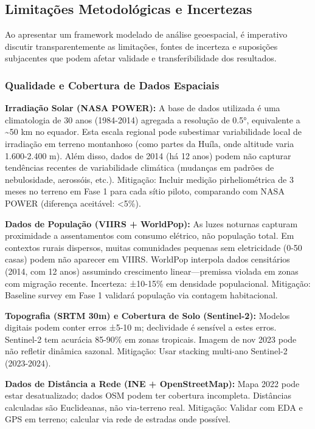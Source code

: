 \documentclass[12pt, a4paper]{article}
\begin{document}
\subsection{Limitações Metodológicas e Incertezas}

Ao apresentar um framework modelado de análise geoespacial, é imperativo discutir transparentemente as limitações, fontes de incerteza e suposições subjacentes que podem afetar validade e transferibilidade dos resultados.

\subsubsection{Qualidade e Cobertura de Dados Espaciais}

\textbf{Irradiação Solar (NASA POWER):} A base de dados utilizada é uma climatologia de 30 anos (1984-2014) agregada a resolução de 0.5°, equivalente a \textasciitilde{}50 km no equador. Esta escala regional pode subestimar variabilidade local de irradiação em terreno montanhoso (como partes da Huíla, onde altitude varia 1.600-2.400 m). Além disso, dados de 2014 (há 12 anos) podem não capturar tendências recentes de variabilidade climática (mudanças em padrões de nebulosidade, aerossóis, etc.). Mitigação: Incluir medição pirheliométrica de 3 meses no terreno em Fase 1 para cada sítio piloto, comparando com NASA POWER (diferença aceitável: <5\%).

\textbf{Dados de População (VIIRS + WorldPop):} As luzes noturnas capturam proximidade a assentamentos com consumo elétrico, não população total. Em contextos rurais dispersos, muitas comunidades pequenas sem eletricidade (0-50 casas) podem não aparecer em VIIRS. WorldPop interpola dados censitários (2014, com 12 anos) assumindo crescimento linear—premissa violada em zonas com migração recente. Incerteza: ±10-15\% em densidade populacional. Mitigação: Baseline survey em Fase 1 validará população via contagem habitacional.

\textbf{Topografia (SRTM 30m) e Cobertura de Solo (Sentinel-2):} Modelos digitais podem conter erros ±5-10 m; declividade é sensível a estes erros. Sentinel-2 tem acurácia 85-90\% em zonas tropicais. Imagem de nov 2023 pode não refletir dinâmica sazonal. Mitigação: Usar stacking multi-ano Sentinel-2 (2023-2024).

\textbf{Dados de Distância a Rede (INE + OpenStreetMap):} Mapa 2022 pode estar desatualizado; dados OSM podem ter cobertura incompleta. Distâncias calculadas são Euclideanas, não via-terreno real. Mitigação: Validar com EDA e GPS em terreno; calcular via rede de estradas onde possível.
\end{document}
